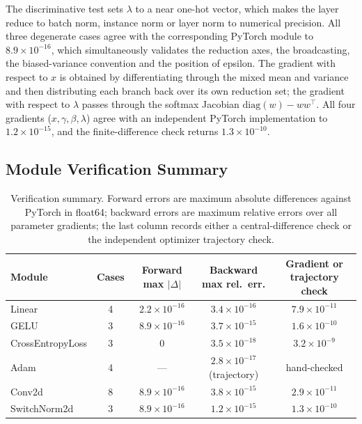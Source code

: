 \documentclass[10pt]{article}
\begin{document}
The discriminative test sets $\lambda$ to a near one-hot vector, which makes the layer reduce to
batch norm, instance norm or layer norm to numerical precision. All three degenerate cases agree with the corresponding
PyTorch module to $8.9\times10^{-16}$, which simultaneously validates the reduction axes, the
broadcasting, the biased-variance convention and the position of epsilon. The gradient with respect
to $x$ is obtained by differentiating through the mixed mean and variance and then distributing each
branch back over its own reduction set; the gradient with respect to $\lambda$ passes through the
softmax Jacobian $\mathrm{diag}(w)-ww^{\top}$. All four gradients ($x,\gamma,\beta,\lambda$) agree
with an independent PyTorch implementation to $1.2\times10^{-15}$, and the finite-difference check
returns $1.3\times10^{-10}$.

\subsection{Module Verification Summary}

\begin{table}[t]
\centering
\caption{Verification summary. Forward errors are maximum absolute differences against PyTorch in
float64; backward errors are maximum relative errors over all parameter gradients; the last column
records either a central-difference check or the independent optimizer trajectory check.}
\label{tab:partb-verification}
\begin{tabular}{@{}lcccc@{}}
\toprule
Module & Cases & Forward max $\lvert\Delta\rvert$ & Backward max rel.\ err. & Gradient or trajectory check \\
\midrule
Linear           & 4 & $2.2\times10^{-16}$ & $3.4\times10^{-16}$ & $7.9\times10^{-11}$ \\
GELU             & 3 & $8.9\times10^{-16}$ & $3.7\times10^{-15}$ & $1.6\times10^{-10}$ \\
CrossEntropyLoss & 3 & $0$                 & $3.5\times10^{-18}$ & $3.2\times10^{-9}$  \\
Adam             & 4 & ---                 & $2.8\times10^{-17}$ (trajectory) & hand-checked \\
Conv2d           & 8 & $8.9\times10^{-16}$ & $3.8\times10^{-15}$ & $2.9\times10^{-11}$ \\
SwitchNorm2d     & 3 & $8.9\times10^{-16}$ & $1.2\times10^{-15}$ & $1.3\times10^{-10}$ \\
\bottomrule
\end{tabular}
\end{table}
\end{document}

